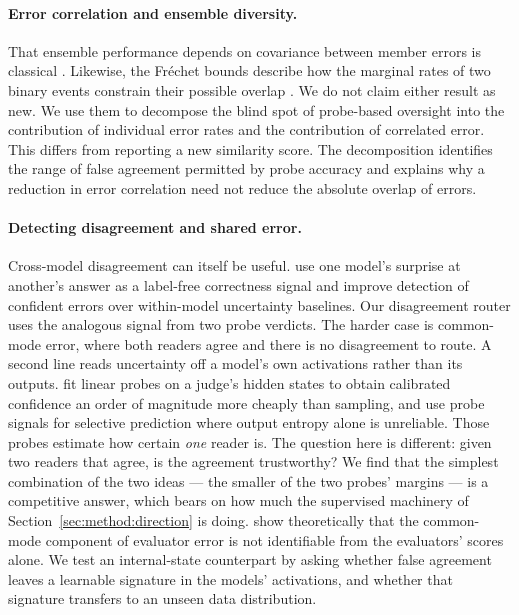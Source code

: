 \paragraph{Error correlation and ensemble diversity.}
That ensemble performance depends on covariance between member errors is
classical \citep{brown2005diversity}. Likewise, the Fr\'echet bounds describe
how the marginal rates of two binary events constrain their possible overlap
\citep{frechet1951tableaux}. We do not claim either result as new. We use them
to decompose the blind spot of probe-based oversight into the contribution of
individual error rates and the contribution of correlated error. This differs
from reporting a new similarity score. The decomposition identifies the range
of false agreement permitted by probe accuracy and explains why a reduction in
error correlation need not reduce the absolute overlap of errors.

\paragraph{Detecting disagreement and shared error.}
Cross-model disagreement can itself be useful. \citet{gorbett2026disagreement}
use one model's surprise at another's answer as a label-free correctness signal
and improve detection of confident errors over within-model uncertainty
baselines. Our disagreement router uses the analogous signal from two probe
verdicts. The harder case is common-mode error, where both readers agree and
there is no disagreement to route. A second line reads uncertainty off a model's own activations rather than its
outputs. \citet{radharapu2026calibrating} fit linear probes on a judge's hidden
states to obtain calibrated confidence an order of magnitude more cheaply than
sampling, and \citet{bao2025probing} use probe signals for selective prediction
where output entropy alone is unreliable. Those probes estimate how certain
\emph{one} reader is. The question here is different: given two readers that
agree, is the agreement trustworthy? We find that the simplest combination of
the two ideas --- the smaller of the two probes' margins --- is a competitive
answer, which bears on how much the supervised machinery of
Section~\ref{sec:method:direction} is doing.
%
\citet{afrin2026ensembles} show theoretically
that the common-mode component of evaluator error is not identifiable from the
evaluators' scores alone. We test an internal-state counterpart by asking whether false
agreement leaves a learnable signature in the models' activations, and whether
that signature transfers to an unseen data distribution.
